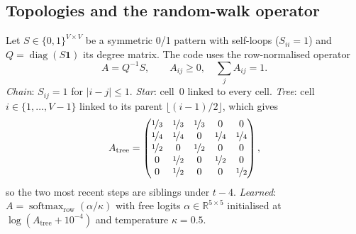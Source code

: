 \documentclass[10pt]{article}
\begin{document}
\subsection{Topologies and the random-walk operator}\label{sec:topologies}
Let $S \in \{0,1\}^{V\times V}$ be a symmetric 0/1 pattern with self-loops ($S_{ii}=1$) and $Q = \operatorname{diag}(S\mathbf{1})$ its degree matrix. The code uses the row-normalised operator
\begin{equation}\label{eq:rownorm}
A = Q^{-1} S, \qquad A_{ij} \ge 0, \quad \textstyle\sum_j A_{ij} = 1 .
\end{equation}
\emph{Chain}: $S_{ij}=1$ for $|i-j|\le1$. \emph{Star}: cell~0 linked to every cell. \emph{Tree}: cell $i\in\{1,\dots,V{-}1\}$ linked to its parent $\lfloor (i-1)/2\rfloor$, which gives
\begin{equation}\label{eq:atree}
A_{\text{tree}} = \begin{pmatrix}
\nicefrac13 & \nicefrac13 & \nicefrac13 & 0 & 0\\
\nicefrac14 & \nicefrac14 & 0 & \nicefrac14 & \nicefrac14\\
\nicefrac12 & 0 & \nicefrac12 & 0 & 0\\
0 & \nicefrac12 & 0 & \nicefrac12 & 0\\
0 & \nicefrac12 & 0 & 0 & \nicefrac12
\end{pmatrix},
\end{equation}
so the two most recent steps are siblings under $t{-}4$. \emph{Learned}: $A = \operatorname{softmax}_{\text{row}}(\alpha/\kappa)$ with free logits $\alpha\in\mathbb{R}^{5\times5}$ initialised at $\log(A_{\text{tree}}+10^{-4})$ and temperature $\kappa{=}0.5$.
\end{document}
